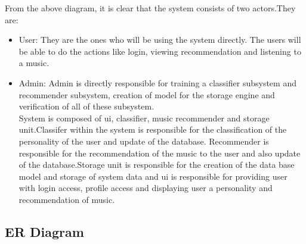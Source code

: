 From the above diagram, it is clear that the system consists of two actors.They are:
\begin{itemize}
\item User: They are the ones who will be using the system directly. The users will be able to do the actions like login, viewing recommendation and listening to a music.
\item Admin: Admin is directly responsible for training a classifier subsystem and recommender subsystem, creation of model for the storage engine and verification of all of these subsystem.
\\
System is composed of ui, classifier, music recommender and storage unit.Classifer within the system is responsible for the classification of the personality of the user and update of the database. Recommender is responsible for the recommendation of the music to the user and also update of the database.Storage unit is responsible for the creation of the data base model and storage of system data and ui is responsible for providing user with login access, profile access and displaying user a personality and recommendation of music.
\end{itemize}

\newpage
\subsection{ER Diagram}

